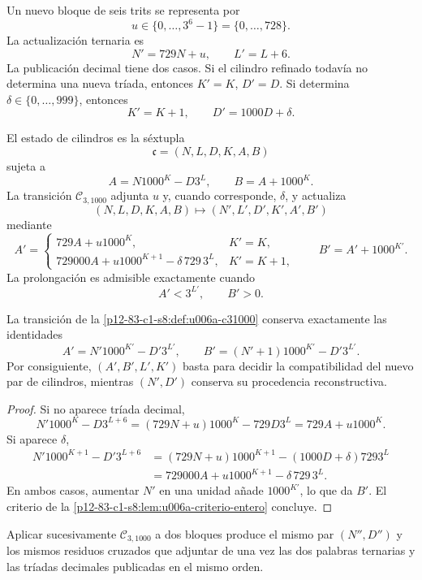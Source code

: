 {Un nuevo bloque de seis trits se representa por
\[
 u\in\{0,\ldots,3^6-1\}=\{0,\ldots,728\}.
\]
La actualización ternaria es
\[
 N'=729N+u,
 \qquad L'=L+6.
\]
La publicación decimal tiene dos casos. Si el cilindro refinado todavía no
determina una nueva tríada, entonces \(K'=K\), \(D'=D\). Si determina
\(\delta\in\{0,\ldots,999\}\), entonces
\[
 K'=K+1,
 \qquad D'=1000D+\delta.
\]

\begin{definition}
\label{p12-83-c1-s8:def:u006a-c31000}
El estado de cilindros es la séxtupla
\[
 \mathfrak c=(N,L,D,K,A,B)
\]
sujeta a
\[
 A=N1000^K-D3^L,
 \qquad B=A+1000^K.
\]
La transición \(\mathcal C_{3,1000}\) adjunta \(u\) y, cuando corresponde,
\(\delta\), y actualiza
\[
 (N,L,D,K,A,B)\longmapsto
 (N',L',D',K',A',B')
\]
mediante
\[
 A'=
 \begin{cases}
  729A+u1000^K,&K'=K,\\[1mm]
  729000A+u1000^{K+1}-\delta\,729\,3^L,&K'=K+1,
 \end{cases}
 \qquad
 B'=A'+1000^{K'}.
\]
La prolongación es admisible exactamente cuando
\[
 A'<3^{L'},\qquad B'>0.
\]
\end{definition}

\begin{theorem}
\label{p12-83-c1-s8:thm:u006a-exactitud-c31000}
La transición de la \cref{p12-83-c1-s8:def:u006a-c31000} conserva exactamente las
identidades
\[
 A'=N'1000^{K'}-D'3^{L'},
 \qquad
 B'=(N'+1)1000^{K'}-D'3^{L'}.
\]
Por consiguiente, \((A',B',L',K')\) basta para decidir la compatibilidad del
nuevo par de cilindros, mientras \((N',D')\) conserva su procedencia
reconstructiva.
\end{theorem}

\begin{proof}
Si no aparece tríada decimal,
\[
 N'1000^K-D3^{L+6}
 =(729N+u)1000^K-729D3^L
 =729A+u1000^K.
\]
Si aparece \(\delta\),
\begin{align*}
 N'1000^{K+1}-D'3^{L+6}
 &=(729N+u)1000^{K+1}-(1000D+\delta)7293^L\\
 &=729000A+u1000^{K+1}-\delta\,729\,3^L.
\end{align*}
En ambos casos, aumentar \(N'\) en una unidad añade \(1000^{K'}\), lo que
da \(B'\). El criterio de la \cref{p12-83-c1-s8:lem:u006a-criterio-entero} concluye.
\end{proof}

\begin{proposition}
\label{p12-83-c1-s8:prop:u006a-concatenacion-c31000}
Aplicar sucesivamente \(\mathcal C_{3,1000}\) a dos bloques produce el
mismo par \((N'',D'')\) y los mismos residuos cruzados que adjuntar de una
vez las dos palabras ternarias y las tríadas decimales publicadas en el
mismo orden.
\end{proposition}

}
